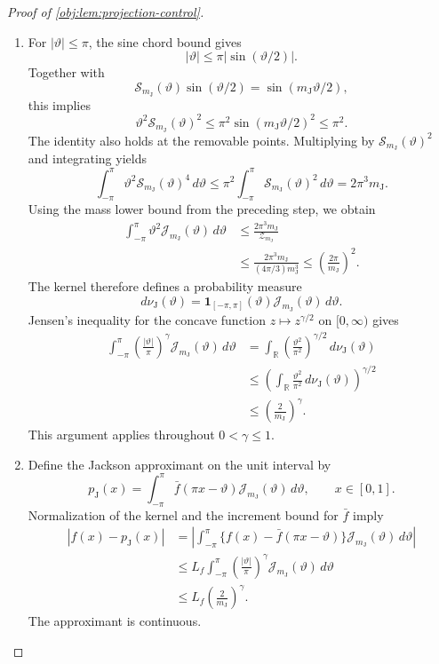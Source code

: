 \documentclass[11pt]{article}
\begin{document}
\begin{proof}[Proof of \cref{obj:lem:projection-control}]
\begin{enumerate}
\item For \(|\vartheta|\le\pi\), the sine chord bound gives
\[
|\vartheta|\le\pi|\sin(\vartheta/2)|.
\]
Together with
\[
\mathcal S_{m_{\mathrm J}}(\vartheta)\sin(\vartheta/2)
=\sin(m_{\mathrm J}\vartheta/2),
\]
this implies
\[
\vartheta^2\mathcal S_{m_{\mathrm J}}(\vartheta)^2
\le\pi^2\sin(m_{\mathrm J}\vartheta/2)^2
\le\pi^2.
\]
The identity also holds at the removable points. Multiplying by
\(\mathcal S_{m_{\mathrm J}}(\vartheta)^2\) and integrating yields
\[
\int_{-\pi}^{\pi}
 \vartheta^2\mathcal S_{m_{\mathrm J}}(\vartheta)^4\,d\vartheta
\le
\pi^2\int_{-\pi}^{\pi}
 \mathcal S_{m_{\mathrm J}}(\vartheta)^2\,d\vartheta
=2\pi^3m_{\mathrm J}.
\]
Using the mass lower bound from the preceding step, we obtain
\[
\begin{aligned}
\int_{-\pi}^{\pi}\vartheta^2\mathcal J_{m_{\mathrm J}}(\vartheta)\,d\vartheta
&\le \frac{2\pi^3m_{\mathrm J}}{\mathcal Z_{m_{\mathrm J}}}\\
&\le \frac{2\pi^3m_{\mathrm J}}
              {(4\pi/3)m_{\mathrm J}^3}
\le \left(\frac{2\pi}{m_{\mathrm J}}\right)^2.
\end{aligned}
\]
The kernel therefore defines a probability measure
\[
d\nu_{\mathrm J}(\vartheta)
=\mathbf 1_{[-\pi,\pi]}(\vartheta)
 \mathcal J_{m_{\mathrm J}}(\vartheta)\,d\vartheta.
\]
Jensen's inequality for the concave function \(z\mapsto z^{\gamma/2}\) on \([0,\infty)\) gives
\[
\begin{aligned}
\int_{-\pi}^{\pi}
 \left(\frac{|\vartheta|}{\pi}\right)^\gamma
 \mathcal J_{m_{\mathrm J}}(\vartheta)\,d\vartheta
&=
\int_{\mathbb R}
 \left(\frac{\vartheta^2}{\pi^2}\right)^{\gamma/2}
 \,d\nu_{\mathrm J}(\vartheta)\\
&\le
\left(\int_{\mathbb R}\frac{\vartheta^2}{\pi^2}
 \,d\nu_{\mathrm J}(\vartheta)\right)^{\gamma/2}\\
&\le\left(\frac{2}{m_{\mathrm J}}\right)^\gamma.
\end{aligned}
\]
This argument applies throughout \(0<\gamma\le1\).

\item Define the Jackson approximant on the unit interval by
\[
p_{\mathrm J}(x)
=\int_{-\pi}^{\pi}
 \bar f(\pi x-\vartheta)\mathcal J_{m_{\mathrm J}}(\vartheta)\,d\vartheta,
\qquad x\in[0,1].
\]
Normalization of the kernel and the increment bound for \(\bar f\) imply
\[
\begin{aligned}
|f(x)-p_{\mathrm J}(x)|
&=\left|\int_{-\pi}^{\pi}
  \{f(x)-\bar f(\pi x-\vartheta)\}
  \mathcal J_{m_{\mathrm J}}(\vartheta)\,d\vartheta\right|\\
&\le L_f\int_{-\pi}^{\pi}
 \left(\frac{|\vartheta|}{\pi}\right)^\gamma
 \mathcal J_{m_{\mathrm J}}(\vartheta)\,d\vartheta\\
&\le L_f\left(\frac{2}{m_{\mathrm J}}\right)^\gamma.
\end{aligned}
\]
The approximant is continuous.


\end{enumerate}
\end{proof}
\end{document}

